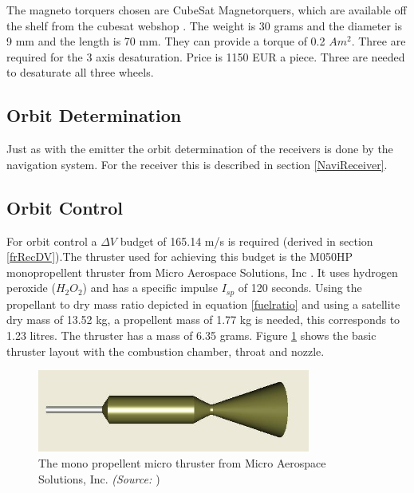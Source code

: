 The magneto torquers chosen are CubeSat Magnetorquers, which are available off the shelf from the cubesat webshop \cite{cubesatshop}. The weight is 30 grams and the diameter is 9 mm and the length is 70 mm. They can provide a torque of 0.2 $Am^2$. Three are required for the 3 axis desaturation. Price is 1150 EUR a piece. Three are needed to desaturate all three wheels.

\subsection{Orbit Determination}
\label{ss:recDDods}
Just as with the emitter the orbit determination of the receivers is done by the navigation system. For the receiver this is described in section \ref{NaviReceiver}.

\subsection{Orbit Control}
\label{ss:recDDocs}
For orbit control a $\Delta V$ budget of 165.14 m/s is required (derived in section \ref{frRecDV}).The thruster used for achieving this budget is the M050HP monopropellent thruster from Micro Aerospace Solutions, Inc \cite{h2o2thruster}. It uses hydrogen peroxide ($H_2O_2$) and has a specific impulse $I_{sp}$ of 120 seconds. Using the propellant to dry mass ratio depicted in equation \ref{fuelratio} and using a satellite dry mass of  13.52 kg, a propellent mass of  1.77 kg is needed, this corresponds to 1.23 litres. The thruster has a mass of 6.35 grams. Figure \ref{fig:microthrust} shows the basic thruster layout with the combustion chamber, throat and nozzle.

\begin{figure} [h]
\centering
\includegraphics[width=0.8\textwidth]{chapters/img/MAS_acsThruster.jpg}
\caption[Micro thruster]{The mono propellent micro thruster from Micro Aerospace Solutions, Inc. \emph{(Source: \cite{h2o2thruster}})}
\label{fig:microthrust}
\end{figure}

